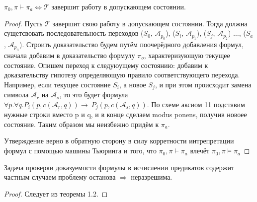 \begin{theorem} 
    $\pi_0, \pi \vdash \pi_a \Longleftrightarrow \mathcal{T}$ завершит работу в допускающем состоянии.
\end{theorem} 
\begin{proof}
    Пусть $\mathcal{T}$ завершит свою работу в допускающем состоянии. Тогда должна сущетсвовать
    последовательность переходов ($S_0$, $\mathcal{A}_{p_0}$), ($S_i$, $\mathcal{A}_{p_1}$), ($S_j$,
    $\mathcal{A}_{p_2}$) $\ldots$, ($S_a$, $\mathcal{A}_{p_n}$). Строить доказательство будем путём
    поочерёдного добавления формул, сначала добавим в доказательство формулу $\pi_o$, характеризующую
    текущее состояние. Опишем переход к следуюущему состоянию: добавим к доказательству гипотезу
    определяющую правило соответствующего перехода. Например, если текущее состояние $S_i$, а новое
    $S_j$, и при этом происходит замена символа $\mathcal{A}_r$ на $\mathcal{A}_s$, то это будет формула
    $\forall p.\forall q.P_i(p, c(\mathcal{A}_r, q)) \rightarrow\ P_j(p, c(\mathcal{A}_s, q))$. По схеме
    аксиом 11 подставим нужные строки вместо p и q, и в конце сделаем modus ponens, получив новоее
    состояние. Таким образом мы неизбежно придём к $\pi_a$.
    
    Утверждение верно в обратную сторону в силу корретности интрепретации формул с помощью машины
    Тьюринга и того, что $\pi_0, \pi \vdash \pi_a$ влечёт $\pi_0, \pi \vDash \pi_a$
\end{proof}

\begin{theorem}
    Задача проверки доказуемости формулы в исчислении предикатов содержит частным случаем проблему
    останова $\Rightarrow$ неразрешима.
\end{theorem}
\begin{proof}
    Следует из теоремы 1.2.
\end{proof}
